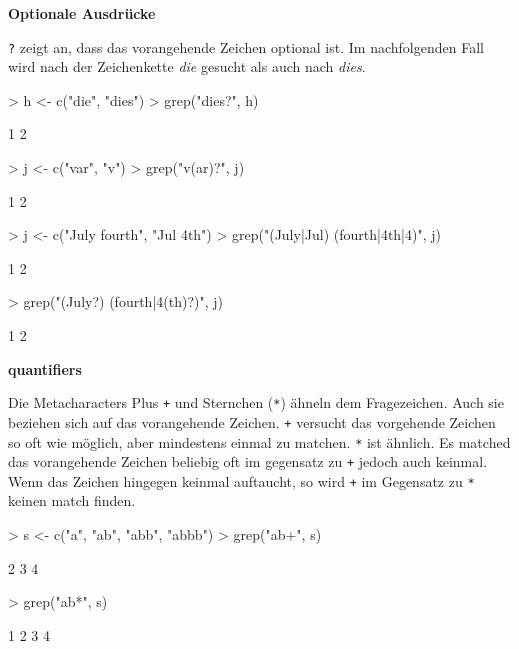 \documentclass[a4paper]{report}
\begin{document}
\textbf{Optionale Ausdrücke}

\verb!?! zeigt an, dass das vorangehende Zeichen optional ist. Im nachfolgenden Fall wird nach der Zeichenkette \emph{die} gesucht als auch nach \emph{dies}.

\begin{Schunk}
\begin{Sinput}
> h <- c("die", "dies")
> grep("dies?", h) 
\end{Sinput}
\begin{Soutput}
[1] 1 2
\end{Soutput}
\end{Schunk}

\begin{Schunk}
\begin{Sinput}
> j <- c("var", "v")
> grep("v(ar)?", j)
\end{Sinput}
\begin{Soutput}
[1] 1 2
\end{Soutput}
\end{Schunk}

\begin{Schunk}
\begin{Sinput}
> j <- c("July fourth", "Jul 4th")
> grep("(July|Jul) (fourth|4th|4)", j)
\end{Sinput}
\begin{Soutput}
[1] 1 2
\end{Soutput}
\begin{Sinput}
> grep("(July?) (fourth|4(th)?)", j)
\end{Sinput}
\begin{Soutput}
[1] 1 2
\end{Soutput}
\end{Schunk}


\textbf{quantifiers}

Die Metacharacters Plus \texttt{+} und Sternchen (\texttt{*}) ähneln dem Fragezeichen. Auch sie beziehen sich auf das vorangehende Zeichen. \texttt{+} versucht das vorgehende Zeichen so oft wie möglich, aber mindestens einmal zu matchen. \texttt{*} ist ähnlich. Es matched das vorangehende Zeichen beliebig oft im gegensatz zu \texttt{+} jedoch auch keinmal. Wenn das Zeichen hingegen keinmal auftaucht, so wird \texttt{+} im Gegensatz zu \texttt{*} keinen match finden. 

\begin{Schunk}
\begin{Sinput}
> s <- c("a", "ab", "abb", "abbb")
> grep("ab+", s)
\end{Sinput}
\begin{Soutput}
[1] 2 3 4
\end{Soutput}
\begin{Sinput}
> grep("ab*", s)
\end{Sinput}
\begin{Soutput}
[1] 1 2 3 4
\end{Soutput}
\end{Schunk}
\end{document}
